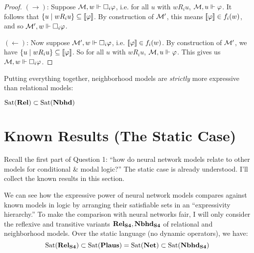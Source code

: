 \documentclass[letterpaper]{article}
\begin{document}
\begin{example*}
\begin{proof}
        $(\to)$: Suppose $\mathcal{M}, w \Vdash \Box_i \varphi$, i.e. for all $u$ with $w{R_i}u$, $\mathcal{M}, u \Vdash \varphi$.  It follows that $\{ u \mid w{R_i}u  \} \subseteq [\![\mbox{\em $ \varphi $\/}]\!]$. By construction of $\mathcal{M}'$, this means $[\![\mbox{\em $ \varphi $\/}]\!] \in f_i(w)$, and so $\mathcal{M}', w \Vdash \Box_i \varphi$.

        $(\leftarrow)$: Now suppose $\mathcal{M}', w \Vdash \Box_i \varphi$, i.e. $[\![\mbox{\em $ \varphi $\/}]\!] \in f_i(w)$.  By construction of $\mathcal{M}'$, we have $\{ u \mid w{R_i}u  \} \subseteq [\![\mbox{\em $ \varphi $\/}]\!]$.  So for all $u$ with $w{R_i}u$, $\mathcal{M}, u \Vdash \varphi$.  This gives us $\mathcal{M}, w \Vdash \Box_i \varphi$.
    \end{proof}

    Putting everything together, neighborhood models are \emph{strictly} more expressive than relational models:
    \begin{proposition}
        $\mathrm{Sat}( \textrm{\textbf{Rel}} ) \subset \mathrm{Sat}( \textrm{\textbf{Nbhd}} )$
    \end{proposition}

\end{example*}


\section*{Known Results (The Static Case)}

Recall the first part of Question 1: ``how do neural network models relate to other models for conditional \& modal logic?'' The static case is already understood. I'll collect the known results in this section.

We can see how the expressive power of neural network models compares against known models in logic by arranging their satisfiable sets in an ``expressivity hierarchy.''  To make the comparison with neural networks fair, I will only consider the reflexive and transitive variants $\textrm{\textbf{Rel}}_\textrm{\textbf{S4}}, \textrm{\textbf{Nbhd}}_\textrm{\textbf{S4}}$ of relational and neighborhood models.  Over the static language (no dynamic operators), we have:
\[
\mathrm{Sat}( \textrm{\textbf{Rel}}_\textrm{\textbf{S4}} ) \subset \mathrm{Sat}( \textrm{\textbf{Plaus}} ) = \mathrm{Sat}( \textrm{\textbf{Net}} ) \subset \mathrm{Sat}( \textrm{\textbf{Nbhd}}_\textrm{\textbf{S4}} )
\]
\end{document}
